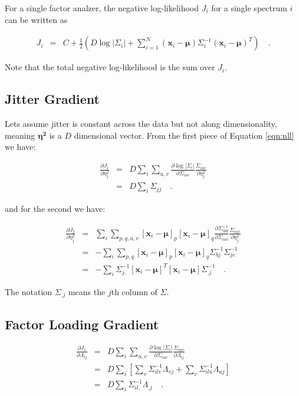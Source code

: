 \documentclass[letterpaper,12pt]{article}
\newcommand{\vect}[1]{\boldsymbol{#1}}
\newcommand{\data}{\vect{x}}
\newcommand{\mean}{\vect{\mu}}
\newcommand{\et}{\vect{\eta^2}}
\begin{document}
For a single factor analzer, the negative log-likelihood $J_i$ for a single spectrum $i$ can be
written as

\begin{eqnarray}\displaystyle
J_{i} &=& C + \frac{1}{2}\left(D\log|\Sigma_i| + \sum_{i=1}^N(\data_i-\mean)\Sigma_i^{-1}(\data_i-\mean)^T\right)
\quad .
\label{eqn:nll}
\end{eqnarray}

Note that the total negative log-likelihood is the sum over $J_i$.

\subsection{Jitter Gradient}

Lets assume jitter is constant across the data but not along
dimensionality, meaning $\et$ is a $D$ dimensional vector.  From the
first piece of Equation \ref{eqn:nll} we have:

\begin{eqnarray}\displaystyle
\frac{\partial J_1}{\partial \eta_j^2} &=& D\sum_i \sum_{u,v}
\frac{\partial \log|\Sigma_i|}{\partial
  \Sigma_{iuv}}\frac{\Sigma_{iuv}}{\partial \eta_j^2} \\
&=& D \sum_i \Sigma_{jj}
\quad .
\label{eqn:gradjit1}
\end{eqnarray}

and for the second we have:

\begin{eqnarray}\displaystyle
\frac{\partial J_2}{\partial \eta_j^2} &=& \sum_i \sum_{p,q,u,v}
[\data_i-\mean]_p [\data_i-\mean]_q\frac{\partial \Sigma^{-1}_{ipq}}{\partial
  \Sigma_{iuv}}\frac{\Sigma_{iuv}}{\partial \eta_j^2} \\
&=& -\sum_i \sum_{p,q}[\data_i-\mean]_p [\data_i-\mean]_q\Sigma_{bj}^{-1}\Sigma_{jc}^{-1}\\
&=& -\sum_i \Sigma_{j.}^{-1}[\data_i-\mean]^T [\data_i-\mean]\Sigma_{.j}^{-1}
\quad .
\label{eqn:gradjit2}
\end{eqnarray}

The notation $\Sigma_{.j}$ means the $j$th column of $\Sigma$.

\subsection{Factor Loading Gradient}

\begin{eqnarray}\displaystyle
\frac{\partial J_1}{\partial \Lambda_{lj}} &=& D\sum_i \sum_{u,v}
\frac{\partial \log|\Sigma_i|}{\partial
  \Sigma_{iuv}}\frac{\Sigma_{iuv}}{\partial \Lambda_{lj}} \\
&=& D \sum_i \left[\sum_v\Sigma^{-1}_{ilv}\Lambda_{vj} + \sum_v\Sigma^{-1}_{ilu}\Lambda_{uj}\right]\\
&=& D \sum_i \Sigma^{-1}_{il.}\Lambda_{.j}
\quad .
\label{eqn:lambda1}
\end{eqnarray}
\end{document}
